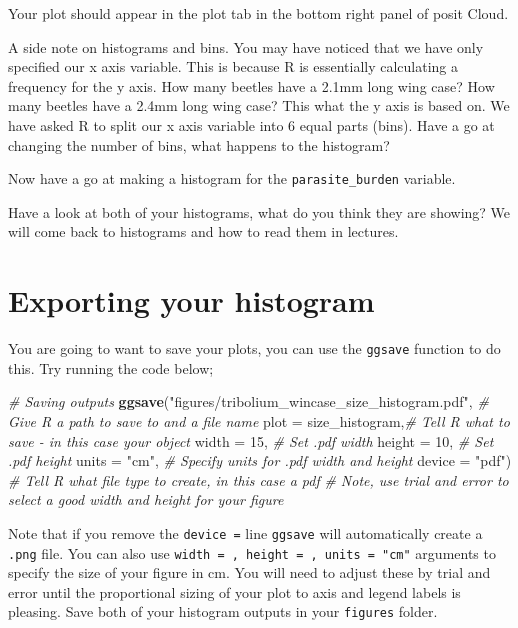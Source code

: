 \documentclass[
]{book}
\newenvironment{Shaded}{\begin{snugshade}}{\end{snugshade}}
\newcommand{\AttributeTok}[1]{\textcolor[rgb]{0.13,0.29,0.53}{#1}}
\newcommand{\CommentTok}[1]{\textcolor[rgb]{0.56,0.35,0.01}{\textit{#1}}}
\newcommand{\DecValTok}[1]{\textcolor[rgb]{0.00,0.00,0.81}{#1}}
\newcommand{\FunctionTok}[1]{\textcolor[rgb]{0.13,0.29,0.53}{\textbf{#1}}}
\newcommand{\NormalTok}[1]{#1}
\newcommand{\StringTok}[1]{\textcolor[rgb]{0.31,0.60,0.02}{#1}}
\begin{document}
Your plot should appear in the plot tab in the bottom right panel of posit Cloud.

A side note on histograms and bins. You may have noticed that we have only specified our x axis variable. This is because R is essentially calculating a frequency for the y axis. How many beetles have a 2.1mm long wing case? How many beetles have a 2.4mm long wing case? This what the y axis is based on. We have asked R to split our x axis variable into 6 equal parts (bins). Have a go at changing the number of bins, what happens to the histogram?

Now have a go at making a histogram for the \texttt{parasite\_burden} variable.

Have a look at both of your histograms, what do you think they are showing? We will come back to histograms and how to read them in lectures.

\hypertarget{export}{%
\section{Exporting your histogram}\label{export}}

You are going to want to save your plots, you can use the \texttt{ggsave} function to do this. Try running the code below;

\begin{Shaded}
\begin{Highlighting}[]
\CommentTok{\# Saving outputs}
\FunctionTok{ggsave}\NormalTok{(}\StringTok{"figures/tribolium\_wincase\_size\_histogram.pdf"}\NormalTok{, }\CommentTok{\# Give R a path to save to and a file name}
       \AttributeTok{plot =}\NormalTok{ size\_histogram,}\CommentTok{\# Tell R what to save {-} in this case your object}
       \AttributeTok{width =} \DecValTok{15}\NormalTok{, }\CommentTok{\# Set .pdf width}
       \AttributeTok{height =} \DecValTok{10}\NormalTok{, }\CommentTok{\# Set .pdf height}
       \AttributeTok{units =} \StringTok{"cm"}\NormalTok{, }\CommentTok{\# Specify units for .pdf width and height}
       \AttributeTok{device =} \StringTok{"pdf"}\NormalTok{) }\CommentTok{\# Tell R what file type to create, in this case a pdf}
\CommentTok{\# Note, use trial and error to select a good width and height for your figure}
\end{Highlighting}
\end{Shaded}

Note that if you remove the \texttt{device\ =} line \texttt{ggsave} will automatically create a \texttt{.png} file. You can also use \texttt{width\ =\ ,\ height\ =\ ,\ units\ =\ "cm"} arguments to specify the size of your figure in cm. You will need to adjust these by trial and error until the proportional sizing of your plot to axis and legend labels is pleasing. Save both of your histogram outputs in your \texttt{figures} folder.
\end{document}
